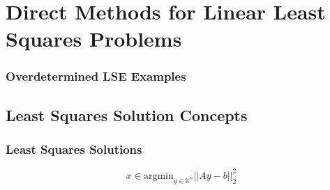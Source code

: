 \documentclass[12pt]{article}
\begin{document}
\section{Direct Methods for Linear Least Squares Problems}
\subsubsection{Overdetermined LSE Examples}
\subsection{Least Squares Solution Concepts}
\subsubsection{Least Squares Solutions}
$$x \in \text{argmin}_{y \in \mathbb{K}^n}||Ay-b||_2^2$$
\end{document}
